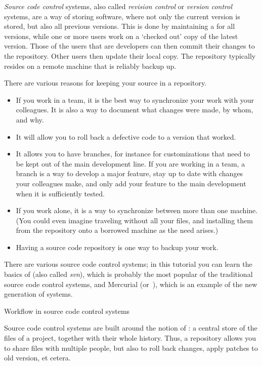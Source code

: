 \emph{Source code control} systems, also
called \emph{revision control}  or
\emph{version control}
systems, are
a way of storing software, where not only the current version is
stored, but also all previous versions. 
This is done by maintaining a  for all versions,
while one or more users work on a `checked out' copy of the latest
version. Those of the users that are developers can then commit their
changes to the repository. Other users then update their local copy.
The repository typically resides on a remote machine that is reliably
backup up.

There are various reasons for keeping your source in a repository.
\begin{itemize}
\item If you work in a team, it is the best way to synchronize your
  work with your colleagues. It is also a way to document what changes
  were made, by whom, and why.
\item It will allow you to roll back a defective code to a version
  that worked.
\item It allows you to have branches, for instance for customizations
  that need to be kept out of the main development line. If you are
  working in a team, a branch is a way to develop a major feature, stay up
  to date with changes your colleagues make, and only add your feature
  to the main development when it is sufficiently tested.
\item If you work alone, it is a way to synchronize between more than
  one machine. (You could even imagine traveling without all your
  files, and installing them from the repository onto a borrowed
  machine as the need arises.)
\item Having a source code repository is one way to backup your work.
\end{itemize}

There are various source code control systems; in this tutorial you
can learn the basics of  (also called
\emph{svn}), which is probably the most popular of the traditional
source code control systems, and Mercurial (or~), which is an
example of the new generation of  systems.

 {Workflow in source code control systems}

Source code control systems are built around the notion
of : a central store of the files of a project,
together with their whole history. Thus, a repository allows you to
share files with multiple people, but also to roll back changes, apply
patches to old version, et cetera.

